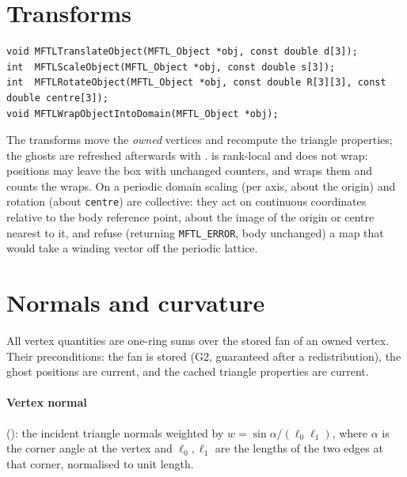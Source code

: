 \section{Transforms}

\begin{lstlisting}[numbers=none]
void MFTLTranslateObject(MFTL_Object *obj, const double d[3]);
int  MFTLScaleObject(MFTL_Object *obj, const double s[3]);
int  MFTLRotateObject(MFTL_Object *obj, const double R[3][3], const double centre[3]);
void MFTLWrapObjectIntoDomain(MFTL_Object *obj);
\end{lstlisting}
The transforms move the \emph{owned} vertices and recompute the triangle properties; the ghosts
are refreshed afterwards with .  is
rank-local and does not wrap: positions may leave the box with unchanged counters, and
 wraps them and counts the wraps. On a periodic domain scaling (per
axis, about the origin) and rotation (about \texttt{centre}) are collective: they act on
continuous coordinates relative to the body reference point, about the image of the origin or
centre nearest to it, and refuse (returning \texttt{MFTL\_ERROR}, body unchanged) a map that
would take a winding vector off the periodic lattice.

\section{Normals and curvature}

All vertex quantities are one-ring sums over the stored fan of an owned vertex. Their
preconditions: the fan is stored (G2, guaranteed after a redistribution), the ghost positions
are current, and the cached triangle properties are current.

\paragraph{Vertex normal} (): the incident triangle normals
weighted by $w=\sin\alpha/(\ell_0\ell_1)$, where $\alpha$ is the corner angle at the vertex and
$\ell_0,\ell_1$ are the lengths of the two edges at that corner, normalised to unit length.

